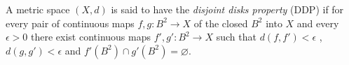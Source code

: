\documentclass[12pt]{article}
\begin{document}
A metric space $(X,d)$ is said to have the \emph{disjoint disks property} (DDP)
if for every pair of continuous maps $f,g: B^2 \to X$ of the closed 
 $B^2$
into $X$ and every $\epsilon > 0$ there exist continuous maps
$f', g' : B^2 \to X$ such that
$d(f,f') < \epsilon$ , 
$d(g,g') < \epsilon$ and
$f'(B^2) \cap g'(B^2) = \varnothing$.




\end{document}
